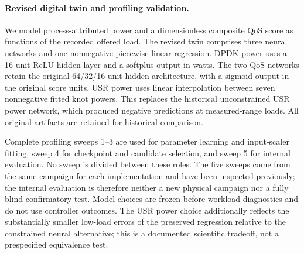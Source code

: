 \paragraph{Revised digital twin and profiling validation.}
We model process-attributed power and a dimensionless composite QoS score as
functions of the recorded offered load. The revised twin comprises three neural
networks and one nonnegative piecewise-linear regression. DPDK power uses a
16-unit ReLU hidden layer and a softplus output in watts. The two QoS networks
retain the original 64/32/16-unit hidden architecture, with a sigmoid output in
the original score units. USR power uses linear interpolation between seven
nonnegative fitted knot powers. This replaces the historical unconstrained USR
power network, which produced negative predictions at measured-range loads.
All original artifacts are retained for historical comparison.

Complete profiling sweeps 1--3 are used for parameter learning and input-scaler
fitting, sweep 4 for checkpoint and candidate selection, and sweep 5 for
internal evaluation. No sweep is divided between these roles. The five sweeps
come from the same campaign for each implementation and have been inspected
previously; the internal evaluation is therefore neither a new physical campaign
nor a fully blind confirmatory test. Model choices are frozen before workload
diagnostics and do not use controller outcomes. The USR power choice additionally
reflects the substantially smaller low-load errors of the preserved regression
relative to the constrained neural alternative; this is a documented scientific
tradeoff, not a prespecified equivalence test.

